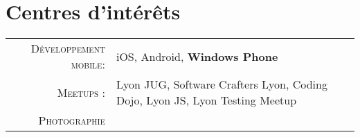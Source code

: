 %
%
%

\section{\texorpdfstring{\color{Blue}Centres d'intérêts}{Centres d'intérêts}}
\begin{tabular}{rl}
    \textsc{Développement mobile:} & iOS, Android, \textbf{Windows Phone}\\
    \textsc{Meetups :} & Lyon JUG, Software Crafters Lyon, Coding Dojo, Lyon JS, Lyon Testing Meetup \\
    \textsc{Photographie} & \\
\end{tabular}
